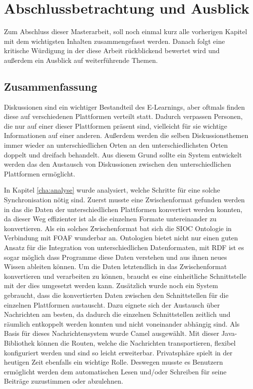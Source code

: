 
\chapter{Abschlussbetrachtung und Ausblick} %
\label{cha:zusammenfassung_und_ausblick}

Zum Abschluss dieser Masterarbeit, soll noch einmal kurz alle vorherigen Kapitel mit dem wichtigsten Inhalten zusammengefasst werden. Danach folgt eine kritische Würdigung in der diese Arbeit rückblickend bewertet wird und außerdem ein Ausblick auf weiterführende Themen. 

\section{Zusammenfassung} %
\label{sec:zusammenfassung} 

Diskussionen sind ein wichtiger Bestandteil des E-Learnings, aber oftmals finden diese auf verschiedenen Plattformen verteilt statt. Dadurch verpassen Personen, die nur auf einer dieser Plattformen präsent sind, vielleicht für sie wichtige Informationen auf einer anderen. Außerdem werden die selben Diskussionsthemen immer wieder an unterschiedlichen Orten an den unterschiedlichsten Orten doppelt und dreifach behandelt. Aus diesem Grund sollte ein System entwickelt werden das den Austausch von Diskussionen zwischen den unterschiedlichen Plattformen ermöglicht. 

In Kapitel \ref{cha:analyse} wurde analysiert, welche Schritte für eine solche Synchronisation nötig sind. Zuerst musste eine Zwischenformat gefunden werden in das die Daten der unterschiedlichen Plattformen konvertiert werden konnten, da dieser Weg effizienter ist als die einzelnen Formate untereinander zu konvertieren. Als ein solches Zwischenformat bat sich die SIOC Ontologie in Verbindung mit FOAF wunderbar an. Ontologien bietet nicht nur einen guten Ansatz für die Integration von unterschiedlichen Datenformaten, mit RDF ist es sogar möglich dass Programme diese Daten verstehen und aus ihnen neues Wissen ableiten können. Um die Daten letztendlich in das Zwischenformat konvertieren und verarbeiten zu können, braucht es eine einheitliche Schnittstelle mit der dies umgesetzt werden kann. Zusätzlich wurde noch ein System gebraucht, dass die konvertierten Daten zwischen den Schnittstellen für die einzelnen Plattformen austauscht. Dazu eignete sich der Austausch über Nachrichten am besten, da dadurch die einzelnen Schnittstellen zeitlich und räumlich entkoppelt werden konnten und nicht voneinander abhängig sind. Als Basis für dieses Nachrichtensystem wurde Camel ausgewählt. Mit dieser Java-Bibliothek können die Routen, welche die Nachrichten transportieren, flexibel konfiguriert werden und sind so leicht erweiterbar. Privatsphäre spielt in der heutigen Zeit ebenfalls ein wichtige Rolle. Deswegen musste es Benutzern ermöglicht werden dem automatischen Lesen und/oder Schreiben für seine Beiträge zuzustimmen oder abzulehnen.

